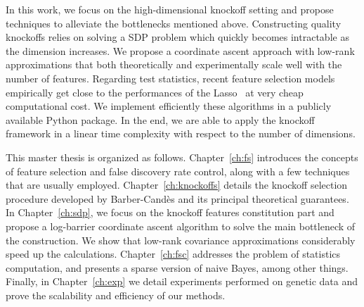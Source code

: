 In this work, we focus on the high-dimensional knockoff setting and propose techniques
to alleviate the bottlenecks mentioned above.
Constructing quality knockoffs relies on solving a SDP problem
which quickly becomes intractable as the dimension increases.
We propose a coordinate ascent approach with low-rank approximations
that both theoretically and experimentally scale well with the number of features.
Regarding test statistics, recent feature selection models~\citep{sparse_naive_bayes, sparse_center_classifiers}
empirically get close to the performances of the Lasso~\citep{lasso} at very cheap computational cost.
We implement efficiently these algorithms in a publicly available Python package.
In the end, we are able to apply the knockoff framework
in a linear time complexity with respect to the number of dimensions.

This master thesis is organized as follows.
Chapter~\ref{ch:fs} introduces the concepts of feature selection and
false discovery rate control, along with a few techniques that are usually employed.
Chapter~\ref{ch:knockoffs} details the knockoff selection procedure developed by Barber-Candès
and its principal theoretical guarantees.
In Chapter~\ref{ch:sdp},
we focus on the knockoff features constitution part
and propose a log-barrier coordinate ascent algorithm to solve the main bottleneck of the construction.
We show that low-rank covariance approximations considerably speed up the calculations.
Chapter~\ref{ch:fsc} addresses the problem of statistics computation,
and presents a sparse version of naive Bayes, among other things.
Finally, in Chapter~\ref{ch:exp} we detail experiments performed on genetic data and prove the scalability
and efficiency of our methods.
